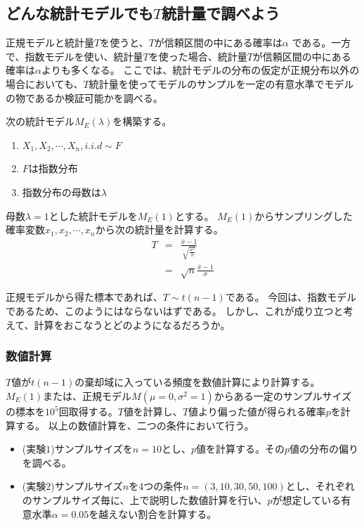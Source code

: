 \subsection{どんな統計モデルでも$T$統計量で調べよう}
正規モデルと統計量$T$を使うと、$T$が信頼区間の中にある確率は$\alpha$ である。一方で、指数モデルを使い、統計量$T$を使った場合、統計量$T$が信頼区間の中にある確率は$\alpha$よりも多くなる。
ここでは、統計モデルの分布の仮定が正規分布以外の場合においても、$T$統計量を使ってモデルのサンプルを一定の有意水準でモデルの物であるか検証可能かを調べる。

次の統計モデル$M_E(\lambda)$を構築する。
\begin{enumerate}
    \item $X_1,X_2,\cdots,X_n ,i.i.d\sim F$
    \item $F$は指数分布
    \item 指数分布の母数は$\lambda$
\end{enumerate}
母数$\lambda=1$とした統計モデルを$M_E(1)$とする。
$M_E(1)$からサンプリングした確率変数$x_1,x_2,\cdots,x_n$から次の統計量を計算する。
\begin{eqnarray*}
    T &=& \frac{\bar{x}-1}{\sqrt{\frac{\sigma^2}{n}}} \\
 &=& \sqrt{n}\frac{\bar{x}-1}{\sigma}%
\end{eqnarray*}

正規モデルから得た標本であれば、$T \sim t(n-1)$である。
今回は、指数モデルであるため、このようにはならないはずである。
しかし、これが成り立つと考えて、計算をおこなうとどのようになるだろうか。

\subsubsection{数値計算}
$T$値が$t(n-1)$の棄却域に入っている頻度を数値計算により計算する。
$M_E(1)$または、正規モデル$M(\mu=0,\sigma^2=1)$からある一定のサンプルサイズの標本を$10^5$回取得する。$T$値を計算し、$T$値より偏った値が得られる確率$p$を計算する。
以上の数値計算を、二つの条件において行う。
\begin{itemize}
 \item (実験$1$)サンプルサイズを$n=10$とし、$p$値を計算する。その$p$値の分布の偏りを調べる。
 \item (実験$2$)サンプルサイズ$n$を4つの条件$n=(3,10,30,50,100)$とし、それぞれのサンプルサイズ毎に、上で説明した数値計算を行い、$p$が想定している有意水準$\alpha=0.05$を越えない割合を計算する。%
\end{itemize}

